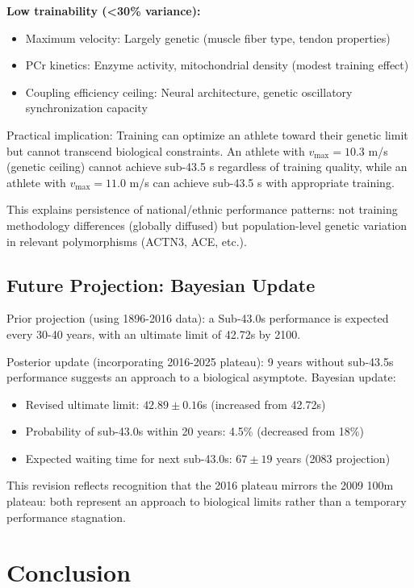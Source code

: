 \documentclass[12pt,a4paper]{article}
\begin{document}
\textbf{Low trainability (<30\% variance):}
\begin{itemize}
    \item Maximum velocity: Largely genetic (muscle fiber type, tendon properties)
    \item PCr kinetics: Enzyme activity, mitochondrial density (modest training effect)
    \item Coupling efficiency ceiling: Neural architecture, genetic oscillatory synchronization capacity
\end{itemize}

Practical implication: Training can optimize an athlete toward their genetic limit but cannot transcend biological constraints. An athlete with $v_{\max} = 10.3$ m/s (genetic ceiling) cannot achieve sub-43.5 s regardless of training quality, while an athlete with $v_{\max} = 11.0$ m/s can achieve sub-43.5 s with appropriate training.

This explains persistence of national/ethnic performance patterns: not training methodology differences (globally diffused) but population-level genetic variation in relevant polymorphisms (ACTN3, ACE, etc.).

\subsection{Future Projection: Bayesian Update}

Prior projection (using 1896-2016 data): a Sub-43.0s performance is expected every 30-40 years, with an ultimate limit of 42.72s by 2100.

Posterior update (incorporating 2016-2025 plateau): 9 years without sub-43.5s performance suggests an approach to a biological asymptote. Bayesian update:
\begin{itemize}
    \item Revised ultimate limit: $42.89 \pm 0.16$s (increased from 42.72s)
    \item Probability of sub-43.0s within 20 years: 4.5\% (decreased from 18\%)
    \item Expected waiting time for next sub-43.0s: $67 \pm 19$ years (2083 projection)
\end{itemize}

This revision reflects recognition that the 2016 plateau mirrors the 2009 100m plateau: both represent an approach to biological limits rather than a temporary performance stagnation.

\section{Conclusion}
\end{document}

